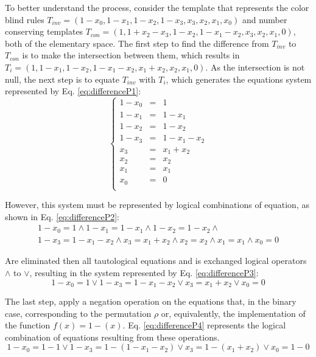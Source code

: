 \documentclass{llncs}
\begin{document}
To better understand the process, consider the template that represents the color blind rules $T_{inv} = (1 - x_0, 1 - x_1, 1 - x_2, 1 - x_3, x_3, x_2, x_1, x_0)$ and number conserving templates $T_{con} = (1, 1 + x_2 - x_3, 1 - x_2, 1 - x_1 - x_2, x_3, x_2, x_1, 0)$, both of the elementary space. The first step to find the difference from $T_{inv}$ to $T_{con}$ is to make the intersection between them, which results in $T_i = (1, 1 - x_1, 1 - x_2, 1 - x_1 - x_2, x_1 + x_2, x_2, x_1, 0)$. As the intersection is not null, the next step is to equate $T_{inv}$ with $T_i$, which generates the equations system represented by Eq. \ref{eq:differenceP1}: \begin{equation} \left\{\begin{matrix} 1 - x_0 & = & 1       \\ 1 - x_1  & = & 1 - x_1     \\ 1 - x_2  & = & 1 - x_2     \\ 1 - x_3  & = & 1 - x_1 - x_2 \\
x_3   & = & x_1 + x_2   \\
x_2   & = & x_2       \\
x_1   & = & x_1       \\
x_0   & = & 0       \\
\end{matrix}\right.
\label{eq:differenceP1}
\end{equation}

However, this system must be represented by logical combinations of equation, as shown in Eq. \ref{eq:differenceP2}:
\begin{equation}
\begin{split}
1 - x_0 = 1       \wedge
1 - x_1 = 1 - x_1   \wedge
1 - x_2 = 1 - x_2   \wedge\\
1 - x_3 = 1 - x_1 - x_2 \wedge 
x_3   = x_1 + x_2   \wedge
x_2   = x_2     \wedge
x_1   = x_1     \wedge
x_0   = 0       
\label{eq:differenceP2}
\end{split}
\end{equation}

Are eliminated then all tautological equations and is exchanged logical operators $\wedge$ to $\vee$, resulting in the system represented by Eq. \ref{eq:differenceP3}:
\begin{equation}
1 - x_0 = 1       \vee 
1 - x_3 = 1 - x_1 - x_2 \vee
x_3   = x_1 + x_2   \vee 
x_0   = 0       
\label{eq:differenceP3}
\end{equation}

The last step, apply a negation operation on the equations that, in the binary case, corresponding to the permutation $\rho $ or, equivalently, the implementation of the function $f(x) = 1 - (x)$. Eq. \ref{eq:differenceP4} represents the logical combination of equations resulting from these operations.
\begin{equation}
1 - x_0 = 1 - 1         \vee 
1 - x_3 = 1 - (1 - x_1 - x_2) \vee
x_3   = 1 - (x_1 + x_2)   \vee 
x_0   = 1 - 0       
\label{eq:differenceP4}
\end{equation}
\end{document}
